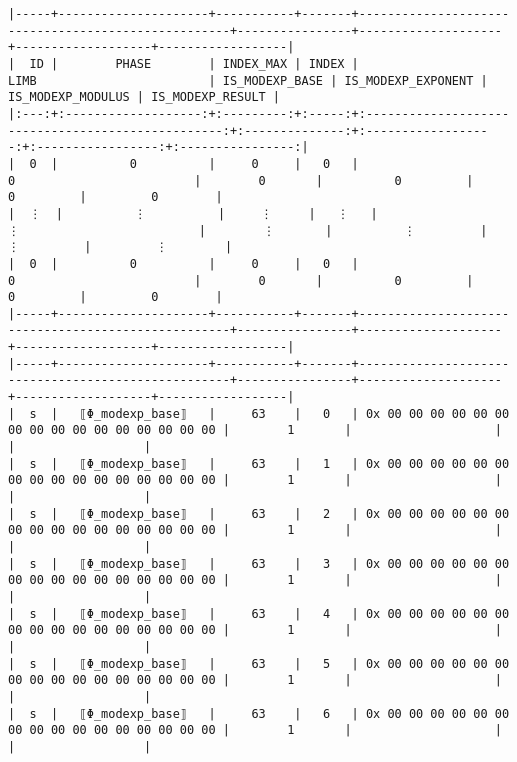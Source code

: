 \documentclass[varwidth=\maxdimen,margin=0.5cm,multi={verbatim}]{standalone}
\begin{document}
\begin{verbatim}
|-----+---------------------+-----------+-------+----------------------------------------------------+----------------+--------------------+-------------------+------------------|
|  ID |        PHASE        | INDEX_MAX | INDEX |                        LIMB                        | IS_MODEXP_BASE | IS_MODEXP_EXPONENT | IS_MODEXP_MODULUS | IS_MODEXP_RESULT |
|:---:+:-------------------:+:---------:+:-----:+:--------------------------------------------------:+:--------------:+:------------------:+:-----------------:+:----------------:|
|  0  |          0          |     0     |   0   |                          0                         |        0       |          0         |         0         |         0        |
|  ⋮  |          ⋮          |     ⋮     |   ⋮   |                          ⋮                         |        ⋮       |          ⋮         |         ⋮         |         ⋮        |
|  0  |          0          |     0     |   0   |                          0                         |        0       |          0         |         0         |         0        |
|-----+---------------------+-----------+-------+----------------------------------------------------+----------------+--------------------+-------------------+------------------|
|-----+---------------------+-----------+-------+----------------------------------------------------+----------------+--------------------+-------------------+------------------|
|  s  |   ⟦Φ_modexp_base⟧   |     63    |   0   | 0x 00 00 00 00 00 00 00 00 00 00 00 00 00 00 00 00 |        1       |                    |                   |                  |
|  s  |   ⟦Φ_modexp_base⟧   |     63    |   1   | 0x 00 00 00 00 00 00 00 00 00 00 00 00 00 00 00 00 |        1       |                    |                   |                  |
|  s  |   ⟦Φ_modexp_base⟧   |     63    |   2   | 0x 00 00 00 00 00 00 00 00 00 00 00 00 00 00 00 00 |        1       |                    |                   |                  |
|  s  |   ⟦Φ_modexp_base⟧   |     63    |   3   | 0x 00 00 00 00 00 00 00 00 00 00 00 00 00 00 00 00 |        1       |                    |                   |                  |
|  s  |   ⟦Φ_modexp_base⟧   |     63    |   4   | 0x 00 00 00 00 00 00 00 00 00 00 00 00 00 00 00 00 |        1       |                    |                   |                  |
|  s  |   ⟦Φ_modexp_base⟧   |     63    |   5   | 0x 00 00 00 00 00 00 00 00 00 00 00 00 00 00 00 00 |        1       |                    |                   |                  |
|  s  |   ⟦Φ_modexp_base⟧   |     63    |   6   | 0x 00 00 00 00 00 00 00 00 00 00 00 00 00 00 00 00 |        1       |                    |                   |                  |

\end{verbatim}
\end{document}
